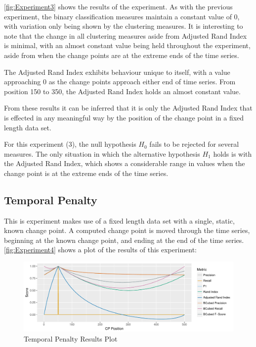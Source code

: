 \documentclass{uvamscse}	%
\begin{document}
\autoref{fig:Experiment3} shows the results of the experiment. As with the previous experiment, the binary classification measures maintain a constant value of $0$, with variation only being shown by the clustering measures. It is interesting to note that the change in all clustering measures aside from Adjusted Rand Index is minimal, with an almost constant value being held throughout the experiment, aside from when the change points are at the extreme ends of the time series.

The Adjusted Rand Index exhibits behaviour unique to itself, with a value approaching 0 as the change points approach either end of time series. From position 150 to 350, the Adjusted Rand Index holds an almost constant value.

From these results it can be inferred that it is only the Adjusted Rand Index that is effected in any meaningful way by the position of the change point in a fixed length data set.

For this experiment (3), the null hypothesis $H_0$ fails to be rejected for several measures. The only situation in which the alternative hypothesis $H_1$ holds is with the Adjusted Rand Index, which shows a considerable range in values when the change point is at the extreme ends of the time series.

\subsection{Temporal Penalty}

This is experiment makes use of a fixed length data set with a single, static, known change point. A computed change point is moved through the time series, beginning at the known change point, and ending at the end of the time series. \autoref{fig:Experiment4} shows a plot of the results of this experiment:

\begin{figure}[h]
    \includegraphics[width=\textwidth]{figures/Experiment3}
    \caption{Temporal Penalty Results Plot}
    \label{fig:Experiment4}
\end{figure}
\end{document}

